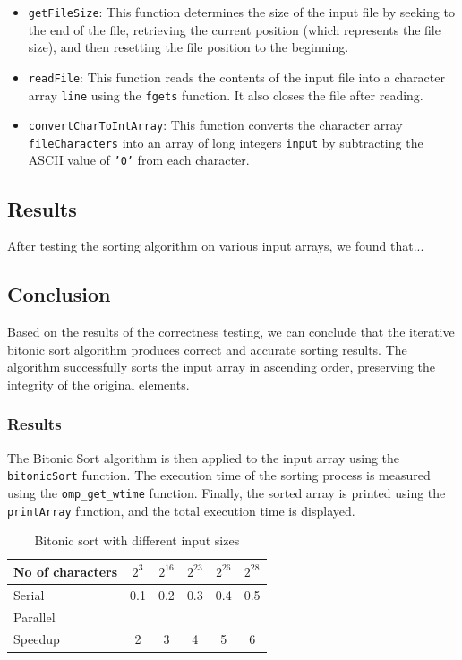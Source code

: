 \begin{itemize}
  \item \texttt{getFileSize}: This function determines the size of the input file by seeking to the end of the file, retrieving the current position (which represents the file size), and then resetting the file position to the beginning.
  \item \texttt{readFile}: This function reads the contents of the input file into a character array \texttt{line} using the \texttt{fgets} function. It also closes the file after reading.
  \item \texttt{convertCharToIntArray}: This function converts the character array \texttt{fileCharacters} into an array of long integers \texttt{input} by subtracting the ASCII value of \texttt{'0'} from each character.
\end{itemize}

\subsection*{Results}

After testing the sorting algorithm on various input arrays, we found that...


\subsection*{Conclusion}

Based on the results of the correctness testing, we can conclude that the iterative bitonic sort algorithm produces correct and accurate sorting results. The algorithm successfully sorts the input array in ascending order, preserving the integrity of the original elements.




\subsubsection*{Results}
The Bitonic Sort algorithm is then applied to the input array using the \texttt{bitonicSort} function. The execution time of the sorting process is measured using the \texttt{omp\_get\_wtime} function. Finally, the sorted array is printed using the \texttt{printArray} function, and the total execution time is displayed.
\begin{table}[htb]
	\centering
	\caption{Bitonic sort with different input sizes}\label{tab:example}
	\begin{tabular}{l|ccccc}
		\toprule
		No of characters & $2^3$ & $2^{16}$ & $2^{23}$ & $2^{26}$ & $2^{28}$\\
		\midrule
		Serial &0.1&0.2&0.3&0.4&0.5\\
		Parallel &&&&\\
		Speedup &2&3&4&5&6\\
		\bottomrule
	\end{tabular}
\end{table} 
